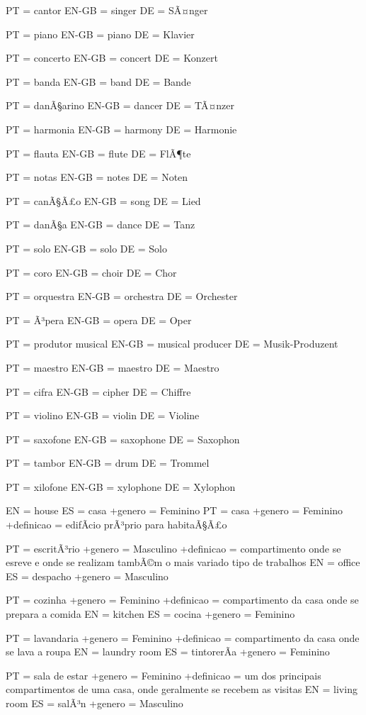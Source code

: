 \documentclass[a4paper]{article}
\begin{document}
PT = cantor
EN-GB = singer
DE = SÃ¤nger

PT = piano
EN-GB = piano
DE = Klavier

PT = concerto
EN-GB = concert
DE = Konzert

PT = banda
EN-GB = band
DE = Bande

PT = danÃ§arino
EN-GB = dancer
DE = TÃ¤nzer

PT = harmonia
EN-GB = harmony
DE = Harmonie

PT = flauta
EN-GB = flute
DE = FlÃ¶te

PT = notas
EN-GB = notes
DE = Noten

PT = canÃ§Ã£o
EN-GB = song
DE = Lied

PT = danÃ§a
EN-GB = dance
DE = Tanz

PT = solo
EN-GB = solo
DE = Solo

PT = coro
EN-GB = choir
DE = Chor

PT = orquestra
EN-GB = orchestra
DE = Orchester

PT = Ã³pera
EN-GB = opera
DE = Oper

PT = produtor musical
EN-GB = musical producer
DE = Musik-Produzent

PT = maestro
EN-GB = maestro
DE = Maestro

PT = cifra
EN-GB = cipher
DE = Chiffre

PT = violino
EN-GB = violin
DE = Violine

PT = saxofone
EN-GB = saxophone
DE = Saxophon

PT = tambor
EN-GB = drum
DE = Trommel

PT = xilofone
EN-GB = xylophone
DE = Xylophon

EN = house
ES = casa
+genero = Feminino
PT = casa
+genero = Feminino
+definicao = edifÃ\-cio prÃ³prio para habitaÃ§Ã£o

PT = escritÃ³rio
+genero = Masculino
+definicao = compartimento onde se esreve e onde se realizam tambÃ©m o mais variado tipo de trabalhos
EN = office
ES = despacho
+genero = Masculino

PT = cozinha
+genero = Feminino
+definicao = compartimento da casa onde se prepara a comida
EN = kitchen
ES = cocina
+genero = Feminino

PT = lavandaria
+genero = Feminino
+definicao = compartimento da casa onde se lava a roupa
EN = laundry room
ES = tintorerÃ\-a
+genero = Feminino

PT = sala de estar
+genero = Feminino
+definicao = um dos principais compartimentos de uma casa, onde geralmente se recebem as visitas
EN = living room
ES = salÃ³n
+genero = Masculino
\end{document}
